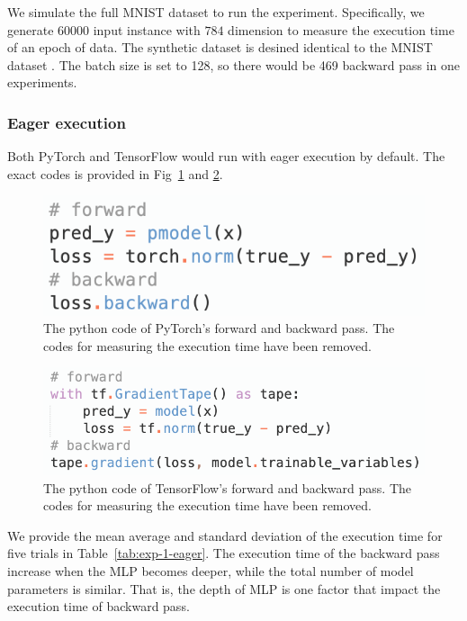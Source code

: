 \documentclass[12pt,twocolumn,letterpaper]{extarticle}
\begin{document}
We simulate the full MNIST dataset to run the experiment. Specifically, we generate 60000 input instance with $784$ dimension to measure the execution time of an epoch of data. The synthetic dataset is desined identical to the MNIST dataset \cite{deng2012mnist}. The batch size is set to 128, so there would be 469 backward pass in one experiments.

\subsubsection{Eager execution} \label{par:eager}

Both PyTorch and TensorFlow would run with eager execution by default. The exact codes is provided in Fig~\ref{fig:pytorch-eager} and \ref{fig:tensorflow-eager}.

\begin{figure}[ht]
    \centering
    \includegraphics[width=0.8\columnwidth]{images/pytorch-eager.png}
    \caption{The python code of PyTorch's forward and backward pass. The codes for measuring the execution time have been removed.}
    \label{fig:pytorch-eager}
\end{figure}

\begin{figure}[ht]
    \centering
    \includegraphics[width=0.8\columnwidth]{images/tensorflow-eager.png}
    \caption{The python code of TensorFlow's forward and backward pass. The codes for measuring the execution time have been removed.}
    \label{fig:tensorflow-eager}
\end{figure}

We provide the mean average and standard deviation of the execution time for five trials in Table~\ref{tab:exp-1-eager}. The execution time of the backward pass increase when the MLP becomes deeper, while the total number of model parameters is similar. That is, the depth of MLP is one factor that impact the execution time of backward pass.
\end{document}
